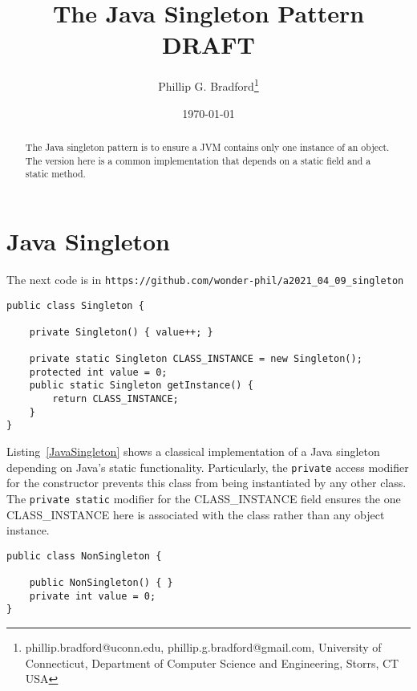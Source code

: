 \documentclass[12pt]{article}
\begin{document}
\title{{\bf The Java Singleton Pattern\\DRAFT}}
\author{
Phillip G. Bradford\thanks{phillip.bradford@uconn.edu, phillip.g.bradford@gmail.com,
{\sc University of Connecticut, Department of Computer Science and Engineering, Storrs, CT USA}}
}

\date{\small\today}

\maketitle

%
%
%
\begin{abstract}
The Java singleton pattern is to ensure a JVM contains only one instance of an object.
The version here is a common implementation that depends on a static field and a static method.
\end{abstract}

%
%
%
%
\section{Java Singleton}
\label{Java Singleton}
%
%
%

The next code is in \lstinline|https://github.com/wonder-phil/a2021_04_09_singleton|


\begin{lstlisting}[label=JavaSingleton,frame=lines,caption=Basic Singleton]
public class Singleton {
	
	private Singleton() { value++; }
	
	private static Singleton CLASS_INSTANCE = new Singleton();
	protected int value = 0;
	public static Singleton getInstance() {
		return CLASS_INSTANCE;
	}
}
\end{lstlisting}

Listing~\ref{JavaSingleton} shows a classical implementation of a Java singleton depending on Java's static functionality.
Particularly, the \lstinline|private| access modifier for the constructor prevents this class from being instantiated by any other
class.
The \lstinline|private static| modifier for the CLASS\_INSTANCE field ensures the one CLASS\_INSTANCE here is associated with the class
rather than any object instance.

\begin{lstlisting}[label=JavaNONSingleton,frame=lines,caption=Basic Non-Singleton]
public class NonSingleton {
	
	public NonSingleton() { }
	private int value = 0;
}
\end{lstlisting}
\end{document}

